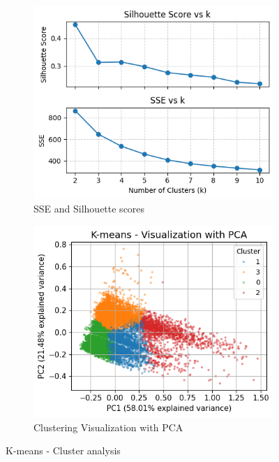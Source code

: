 \begin{figure}[H]
    \centering
    \begin{subfigure}[b]{0.48\textwidth}
        \centering
        \includegraphics[width=\textwidth]{plots/sse_silh_kmeans_def.png}
        \caption{SSE and Silhouette scores}
        \label{fig:sse_silh_kmeans}
    \end{subfigure}
    \begin{subfigure}[b]{0.48\textwidth}
        \centering
        \includegraphics[width=\textwidth]{plots/kmeans_clusters.png}
        \caption{Clustering Visualization with PCA}
        \label{fig:kmeans_visualization}
    \end{subfigure}
    \caption{K-means - Cluster analysis}
    \label{fig:subplots_kmeans}
\end{figure}
